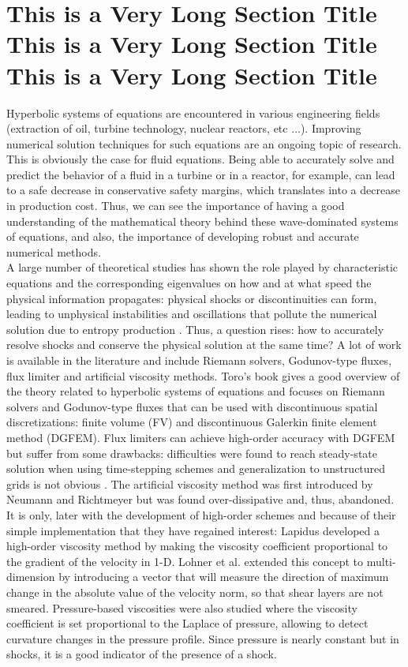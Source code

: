 \section{This is a Very Long Section Title This is a Very Long Section Title This is a Very Long Section Title }
Hyperbolic systems of equations are encountered in various engineering fields (extraction of oil, turbine technology, nuclear reactors, etc $\dots$). Improving numerical solution techniques for such equations are an ongoing topic of research. This is obviously the case for fluid equations. Being able to accurately solve and predict the behavior of a fluid in a turbine or in a reactor, for example, can lead to a safe decrease in conservative safety margins, which translates into a decrease in production cost. Thus, we can see the importance of having a good understanding of the mathematical theory behind these wave-dominated systems of equations, and also, the importance of developing robust and accurate numerical methods.\\
A large number of theoretical studies has shown the role played by characteristic equations and the corresponding eigenvalues on how and at what speed the physical information propagates: physical shocks or discontinuities can form, leading to unphysical instabilities and oscillations that pollute the numerical solution due to entropy production \cite{Toro}. Thus, a question rises: how to accurately resolve shocks and conserve the physical solution at the same time? A lot of work is available in the literature and include Riemann solvers, Godunov-type fluxes, flux limiter and artificial viscosity methods. Toro's book \cite{Toro} gives a good overview of the theory related to hyperbolic systems of equations and focuses on Riemann solvers and Godunov-type fluxes that can be used with discontinuous spatial discretizations: finite volume (FV) and discontinuous Galerkin finite element method (DGFEM).
Flux limiters \cite{FluxLimiter1, FluxLimiter3} can achieve high-order accuracy with DGFEM \cite{FluxLimiter2} but suffer from some drawbacks: difficulties were found to reach steady-state solution when using time-stepping schemes and generalization to unstructured grids is not obvious \cite{FluxLimiter4}. The artificial viscosity method was first introduced by Neumann and Richtmeyer \cite{Neumann} but was found over-dissipative and, thus, abandoned. It is only, later with the development of high-order schemes and because of their simple implementation that they have regained interest: Lapidus \cite{Lapidus_paper, Lapidus_book} developed a high-order viscosity method by making the viscosity coefficient proportional to the gradient of the velocity in 1-D. Lohner et al. \cite{LMP} extended this concept to multi-dimension by introducing a vector that will measure the direction of maximum change in the absolute value of the velocity norm, so that shear layers are not smeared. Pressure-based viscosities were also studied \cite{PBV_book} where the viscosity coefficient is set proportional to the Laplace of pressure, allowing to detect curvature changes in the pressure profile. Since pressure is nearly constant but in shocks, it is a good indicator of the presence of a shock.
